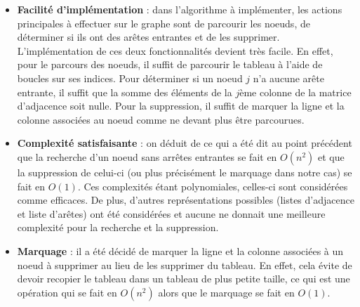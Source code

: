\begin{itemize}
\item \textbf{Facilité d'implémentation} : dans l'algorithme à implémenter, les actions principales à effectuer sur le graphe sont de parcourir les noeuds, de déterminer si ils ont des arêtes entrantes et de les supprimer. L'implémentation de ces deux fonctionnalités devient très facile. En effet, pour le parcours des noeuds, il suffit de parcourir le tableau à l'aide de boucles sur ses indices. Pour déterminer si un noeud $j$ n'a aucune arête entrante, il suffit que la somme des éléments de la $j$ème colonne de la matrice d'adjacence soit nulle. Pour la suppression, il suffit de marquer la ligne et la colonne associées au noeud comme ne devant plus être parcourues.

\item \textbf{Complexité satisfaisante} : on déduit de ce qui a été dit au point précédent que la recherche d'un noeud sans arrêtes entrantes se fait en $O(n^2)$ et que la suppression de celui-ci (ou plus précisément le marquage dans notre cas) se fait en $O(1)$. Ces complexités étant polynomiales, celles-ci sont considérées comme efficaces. De plus, d'autres représentations possibles (listes d'adjacence et liste d'arêtes) ont été considérées et aucune ne donnait une meilleure complexité pour la recherche et la suppression.

\item \textbf{Marquage} : il a été décidé de marquer la ligne et la colonne associées à un noeud à supprimer au lieu de les supprimer du tableau. En effet, cela évite de devoir recopier le tableau dans un tableau de plus petite taille, ce qui est une opération qui se fait en $O(n^2)$ alors que le marquage se fait en $O(1)$.
\end{itemize}
